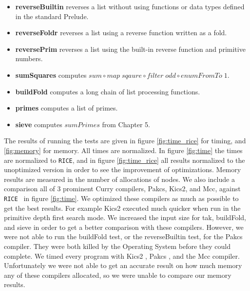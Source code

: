\documentclass{book}
\newcommand{\rice}{\texttt{RICE}}
\newcommand{\ricesp}{\texttt{RICE }}
\theoremstyle{definition}
\newcommand{\Varid}[1]{\mathit{#1}}
\begin{document}
\begin{itemize}
\begin{itemize}
\item \textbf{reverseBuiltin} reverses a list without using functions or data types
                                defined in the standard Prelude.

\item \textbf{reverseFoldr} reverses a list using a reverse function written as a fold.

\item \textbf{reversePrim} reverses a list using the built-in reverse function and primitive numbers.

\item \textbf{sumSquares} computes \ensuremath{\Varid{sum}\mathbin{\circ}\Varid{map}\;\Varid{sqaure}\mathbin{\circ}\Varid{filter}\;\Varid{odd}\mathbin{\circ}\Varid{enumFromTo}\;\mathrm{1}}.

\item \textbf{buildFold} computes a long chain of list processing functions.

\item \textbf{primes} computes a list of primes.

\item \textbf{sieve} computes \ensuremath{\Varid{sumPrimes}} from Chapter 5.
\end{itemize}

\end{itemize}


The results of running the tests are given in figure \ref{fig:time_rice} for timing,
and \ref{fig:memory} for memory.
All times are normalized.
In figure \ref{fig:time} the times are normalized to \rice,
and in figure \ref{fig:time_rice} all results normalized to the unoptimized version
in order to see the improvement of optimizations.
Memory results are measured in the number of allocations of nodes.
We also include a comparison all of 3 prominent Curry compilers, Pakcs, Kics2, and Mcc, against \ricesp
in figure \ref{fig:time}.
We optimized these compilers as much as possible to get the best results.
For example Kics2 executed much quicker when run in the primitive depth first search mode.
We increased the input size for tak, buildFold, and sieve in order to get a better comparison
with these compilers.
However, we were not able to run the buildFold test, or the reverseBuiltin test, for the Pakcs compiler. 
They were both killed by the Operating System before they could complete.
We timed every program with Kics2 \cite{kics2}, Pakcs \cite{pakcs}, and the Mcc \cite{mcc} compiler.
Unfortunately we were not able to get an accurate result on how much memory any of these compilers
allocated, so we were unable to compare our memory results.
\end{document}

